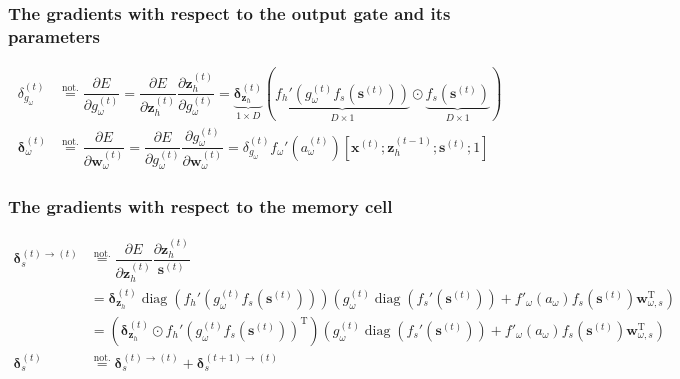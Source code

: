 \documentclass[11pt]{article}
\DeclareMathOperator{\diag}{diag}
\begin{document}
\subsubsection*{The gradients with respect to the output gate and its parameters}

\begin{align}
  \delta_{g_{\omega}}^{(t)} &\overset{\text{not.}}{=} \dfrac{\partial E}{\partial g_{\omega}^{(t)}} = \dfrac{\partial E}{\partial \mathbf{z}_{h}^{(t)}} \dfrac{\partial \mathbf{z}_h^{(t)}}{\partial g_{\omega}^{(t)}} = \underbrace{\boldsymbol{\delta}_{\mathbf{z}_h}^{(t)}}_{1 \times D}\left(\underbrace{f_h'\left(g_{\omega}^{(t)}f_s\left(\mathbf{s}^{(t)}\right)\right)}_{D \times 1} \odot \underbrace{f_s\left(\mathbf{s}^{(t)}\right)}_{D\times1}\right) \\
  \boldsymbol{\delta}_{\omega}^{(t)} &\overset{\text{not.}}{=} \dfrac{\partial E}{\partial \mathbf{w}_{\omega}^{(t)}} = \dfrac{\partial E}{\partial g_{\omega}^{(t)}} \dfrac{\partial g_{\omega}^{(t)}}{\partial \mathbf{w}_{\omega}^{(t)}} = \delta_{g_{\omega}}^{(t)} f_{\omega}'\left(a_{\omega}^{(t)}\right) \left[\mathbf{x}^{(t)}; \mathbf{z}_{h}^{(t-1)}; \mathbf{s}^{(t)}; 1\right]
\end{align}

\subsubsection*{The gradients with respect to the memory cell}

\begin{align}
  \boldsymbol{\delta}_s^{(t)\rightarrow(t)}
  & \overset{\text{not.}}{=}
    \dfrac{\partial E}{\partial \mathbf{z}_h^{(t)}}
    \dfrac{\partial \mathbf{z}_h^{(t)}}{\mathbf{s}^{(t)}}  \\
  & = \boldsymbol{\delta}_{\mathbf{z}_h}^{(t)}
    \diag\left(f_{h}'\left(g_{\omega}^{(t)} f_s\left(\mathbf{s}^{(t)}\right)\right)\right)
    \left( g_{\omega}^{(t)} \diag\left(f_s'\left(\mathbf{s}^{(t)}\right) \right) + f'_{\omega}\left(a_{\omega} \right) f_s\left(\mathbf{s}^{(t)}\right)\mathbf{w}^{\text{T}}_{\omega, s} \right) \\
  & = \left(\boldsymbol{\delta}_{\mathbf{z}_h}^{(t)} \odot
    {f_{h}'\left(g_{\omega}^{(t)} f_s\left(\mathbf{s}^{(t)}\right)\right)}^{\text{T}}\right)
    \left( g_{\omega}^{(t)} \diag\left(f_s'\left(\mathbf{s}^{(t)}\right) \right) + f'_{\omega}\left(a_{\omega} \right) f_s\left(\mathbf{s}^{(t)}\right)\mathbf{w}^{\text{T}}_{\omega, s} \right)\\
  \boldsymbol{\delta}_s^{(t)} &\overset{\text{not.}}{=} \boldsymbol{\delta}^{(t) \rightarrow (t)}_s + \boldsymbol{\delta}^{(t+1) \rightarrow (t)}_s
\end{align}
\end{document}
